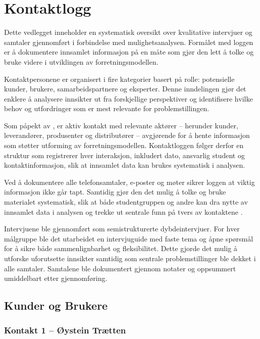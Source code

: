 \section{Kontaktlogg}
\label{app:kontaktlogg}

Dette vedlegget inneholder en systematisk oversikt over kvalitative intervjuer og samtaler gjennomført i forbindelse med mulighetsanalysen. Formålet med loggen er å dokumentere innsamlet informasjon på en måte som gjør den lett å tolke og bruke videre i utviklingen av forretningsmodellen.

Kontaktpersonene er organisert i fire kategorier basert på rolle: potensielle kunder, brukere, samarbeidspartnere og eksperter. Denne inndelingen gjør det enklere å analysere innsikter ut fra forskjellige perspektiver og identifisere hvilke behov og utfordringer som er mest relevante for problemstillingen.

Som påpekt av \textcite{torvatn_teknologiledelse_2024}, er aktiv kontakt med relevante aktører – herunder kunder, leverandører, produsenter og distributører – avgjørende for å hente informasjon som støtter utforming av forretningsmodellen. Kontaktloggen følger derfor en struktur som registrerer hver interaksjon, inkludert dato, ansvarlig student og kontaktinformasjon, slik at innsamlet data kan brukes systematisk i analysen.

Ved å dokumentere alle telefonsamtaler, e-poster og møter sikrer loggen at viktig informasjon ikke går tapt. Samtidig gjør den det mulig å tolke og bruke materialet systematisk, slik at både studentgruppen og andre kan dra nytte av innsamlet data i analysen og trekke ut sentrale funn på tvers av kontaktene \parencite{torvatn_teknologiledelse_2024}.

Intervjuene ble gjennomført som semistrukturerte dybdeintervjuer. For hver målgruppe ble det utarbeidet en intervjuguide med faste tema og åpne spørsmål for å sikre både sammenlignbarhet og fleksibilitet. Dette gjorde det mulig å utforske uforutsette innsikter samtidig som sentrale problemstillinger ble dekket i alle samtaler. Samtalene ble dokumentert gjennom notater og oppsummert umiddelbart etter gjennomføring.

\subsection{Kunder og Brukere}

\subsubsection{Kontakt 1  – Øystein Trætten}
\label{kontakt:traetten}

